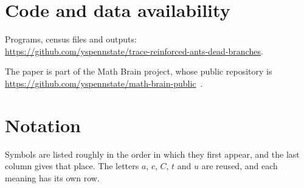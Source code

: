 \documentclass[11pt]{amsart}
\theoremstyle{remark}
\begin{document}
\section*{Code and data availability}
Programs, census files and outputs:\\
\url{https://github.com/yspennstate/trace-reinforced-ants-dead-branches}.

The paper is part of the Math Brain project, whose public repository is
\url{https://github.com/yspennstate/math-brain-public}~\cite{MathBrainRepo}.

\appendix
\section{Notation}\label{app:notation}

Symbols are listed roughly in the order in which they first appear, and the last column gives that place. The letters $a$, $c$, $C$, $t$ and $u$ are reused, and each meaning has its own row.
\end{document}
